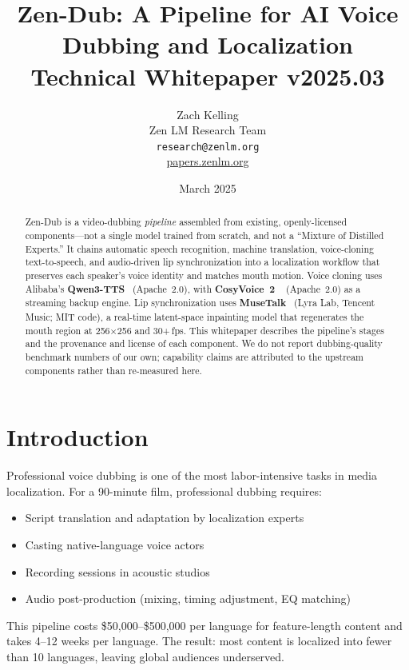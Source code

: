 \documentclass[11pt,a4paper]{article}
\title{\textbf{Zen-Dub: A Pipeline for AI Voice Dubbing and Localization}\\
\large Technical Whitepaper v2025.03}
\author{Zach Kelling \\ Zen LM Research Team\\
\texttt{research@zenlm.org}\\
\href{https://papers.zenlm.org}{papers.zenlm.org}}
\date{March 2025}
\begin{document}
\maketitle

\begin{abstract}
Zen-Dub is a video-dubbing \emph{pipeline} assembled from existing, openly-licensed
components---not a single model trained from scratch, and not a ``Mixture of Distilled
Experts.'' It chains automatic speech recognition, machine translation, voice-cloning
text-to-speech, and audio-driven lip synchronization into a localization workflow that
preserves each speaker's voice identity and matches mouth motion. Voice cloning uses
Alibaba's \textbf{Qwen3-TTS}~\cite{qwen3tts} (Apache~2.0), with \textbf{CosyVoice~2}
~\cite{cosyvoice2} (Apache~2.0) as a streaming backup engine. Lip synchronization uses
\textbf{MuseTalk}~\cite{musetalk} (Lyra Lab, Tencent Music; MIT code), a real-time
latent-space inpainting model that regenerates the mouth region at 256$\times$256 and
30+\,fps. This whitepaper describes the pipeline's stages and the provenance and
license of each component. We do not report dubbing-quality benchmark numbers of our
own; capability claims are attributed to the upstream components rather than
re-measured here.
\end{abstract}

\tableofcontents
\newpage

\section{Introduction}
\label{sec:intro}

Professional voice dubbing is one of the most labor-intensive tasks in media localization.
For a 90-minute film, professional dubbing requires:
\begin{itemize}
\item Script translation and adaptation by localization experts
\item Casting native-language voice actors
\item Recording sessions in acoustic studios
\item Audio post-production (mixing, timing adjustment, EQ matching)
\end{itemize}

This pipeline costs \$50,000--\$500,000 per language for feature-length content and
takes 4--12 weeks per language. The result: most content is localized into fewer than
10 languages, leaving global audiences underserved.
\end{document}
